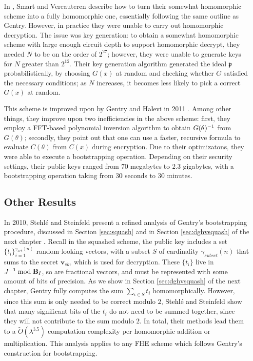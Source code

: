     In \cite{SV09}, Smart and Vercauteren describe how to turn their somewhat homomorphic scheme into a fully homomorphic one, essentially following the same outline as Gentry. However, in practice they were unable to carry out homomorphic decryption. The issue was key generation: to obtain a somewhat homomorphic scheme with large enough circuit depth to support homomorphic decrypt, they needed $N$ to be on the order of $2^{27}$; however, they were unable to generate keys for $N$ greater than $2^{12}$. Their key generation algorithm generated the ideal $\mathfrak{p}$ probabilistically, by choosing $G(x)$ at random and checking whether $G$ satisfied the necessary conditions; as $N$ increases, it becomes less likely to pick a correct $G(x)$ at random.

    This scheme is improved upon by Gentry and Halevi in 2011 \cite{gh11implementing}. Among other things, they improve upon two inefficiencies in the above scheme: first, they employ a FFT-based polynomial inversion algorithm to obtain $G(\theta) ^{-1}$ from $G(\theta)$; secondly, they point out that one can use a faster, recursive formula to evaluate $C(\theta)$ from $C(x)$ during encryption. Due to their optimizatons, they were able to execute a bootstrapping operation. Depending on their security settings, their public keys ranged from 70 megabytes to 2.3 gigabytes, with a bootstrapping operation taking from 30 seconds to 30 minutes.

    \subsection{Other Results}

    In 2010, Stehl\'e and Steinfeld present a refined analysis of Gentry's bootstrapping procedure, discussed in Section \ref{sec:squash} and in Section \ref{sec:dghvsquash} of the next chapter \cite{Stehle2010}. Recall in the squashed scheme, the public key includes a set $\{t_i\}_{i = 1}^{\gamma_{set}(n)}$ random-looking vectors, with a subset $S$ of cardinality $\gamma_{subset}(n)$ that sums to the secret $\mathbf{v}_{sk}$, which is used for decryption. These $\{t_i\}$ live in $J ^{-1} \bmod \textbf{B}_I$, so are fractional vectors, and must be represented with some amount of bits of precision. As we show in Section \ref{sec:dghvsquash} of the next chapter, Gentry fully computes the sum $\sum_{i \in S} t_i$ homomorphically. However, since this sum is only needed to be correct modulo $2$, Stehl\'e and Steinfeld show that many significant bits of the $t_i$ do not need to be summed together, since they will not contribute to the sum modulo $2$. In total, their methods lead them to a $\widetilde{O}(\lambda^{3.5})$ computation complexity per homomorphic addition or multiplication. This analysis applies to any FHE scheme which follows Gentry's construction for bootstrapping.
